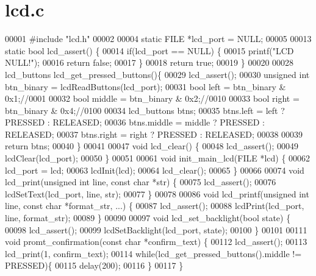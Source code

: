 \section{lcd.\+c}
\label{lcd_8c_source}

\begin{DoxyCode}
00001 \textcolor{preprocessor}{#include "lcd.h"}
00002 
00004 \textcolor{keyword}{static} FILE *lcd_port = NULL;
00005 
00013  \textcolor{keyword}{static} \textcolor{keywordtype}{bool} lcd_assert() \{
00014   \textcolor{keywordflow}{if}(lcd_port == NULL) \{
00015     printf(\textcolor{stringliteral}{"LCD NULL!"});
00016     \textcolor{keywordflow}{return} \textcolor{keyword}{false};
00017   \}
00018   \textcolor{keywordflow}{return} \textcolor{keyword}{true};
00019 \}
00020 
00028 lcd_buttons lcd_get_pressed_buttons()\{
00029   lcd_assert();
00030   \textcolor{keywordtype}{unsigned} \textcolor{keywordtype}{int} btn\_binary = lcdReadButtons(lcd_port);
00031   \textcolor{keywordtype}{bool} left = btn\_binary & 0x1;\textcolor{comment}{//0001}
00032   \textcolor{keywordtype}{bool} middle = btn\_binary & 0x2;\textcolor{comment}{//0010}
00033   \textcolor{keywordtype}{bool} right = btn\_binary & 0x4;\textcolor{comment}{//0100}
00034   lcd_buttons btns;
00035   btns.left = left ? PRESSED : RELEASED;
00036   btns.middle = middle ? PRESSED : RELEASED;
00037   btns.right = right ? PRESSED : RELEASED;
00038 
00039   \textcolor{keywordflow}{return} btns;
00040 \}
00041 
00047 \textcolor{keywordtype}{void} lcd_clear() \{
00048   lcd_assert();
00049   lcdClear(lcd_port);
00050 \}
00051 
00061 \textcolor{keywordtype}{void} init_main_lcd(FILE *lcd) \{
00062   lcd_port = lcd;
00063   lcdInit(lcd);
00064   lcd_clear();
00065 \}
00066 
00074 \textcolor{keywordtype}{void} lcd_print(\textcolor{keywordtype}{unsigned} \textcolor{keywordtype}{int} line, \textcolor{keyword}{const} \textcolor{keywordtype}{char} *str) \{
00075   lcd_assert();
00076   lcdSetText(lcd_port, line, str);
00077 \}
00078 
00086 \textcolor{keywordtype}{void} lcd_printf(\textcolor{keywordtype}{unsigned} \textcolor{keywordtype}{int} line, \textcolor{keyword}{const} \textcolor{keywordtype}{char} *format\_str, ...) \{
00087   lcd_assert();
00088   lcdPrint(lcd_port, line, format\_str);
00089 \}
00090 
00097 \textcolor{keywordtype}{void} lcd_set_backlight(\textcolor{keywordtype}{bool} state) \{
00098   lcd_assert();
00099   lcdSetBacklight(lcd_port, state);
00100 \}
00101 
00111 \textcolor{keywordtype}{void} promt_confirmation(\textcolor{keyword}{const} \textcolor{keywordtype}{char} *confirm\_text) \{
00112   lcd_assert();
00113   lcd_print(1, confirm\_text);
00114   \textcolor{keywordflow}{while}(lcd_get_pressed_buttons().middle != PRESSED)\{
00115     delay(200);
00116   \}
00117 \}
\end{DoxyCode}

